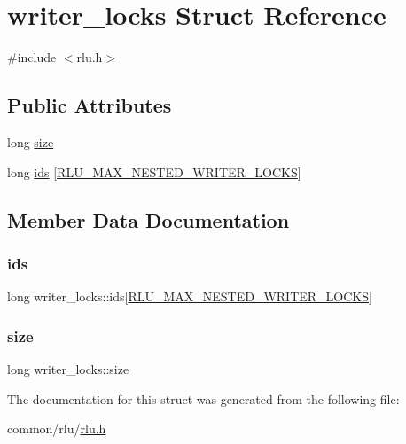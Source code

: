 \hypertarget{structwriter__locks}{}\section{writer\+\_\+locks Struct Reference}
\label{structwriter__locks}


{\ttfamily \#include $<$rlu.\+h$>$}

\subsection*{Public Attributes}
\begin{DoxyCompactItemize}
\item 
long \hyperlink{structwriter__locks_a37620c55c0a1ddde88fd3f857ce7b503}{size}
\item 
long \hyperlink{structwriter__locks_abb68939c5b96b283870aecf6a9a2ec50}{ids} \mbox{[}\hyperlink{rlu_8h_a2dff72d8940c42485455fe15f42735de}{R\+L\+U\+\_\+\+M\+A\+X\+\_\+\+N\+E\+S\+T\+E\+D\+\_\+\+W\+R\+I\+T\+E\+R\+\_\+\+L\+O\+C\+KS}\mbox{]}
\end{DoxyCompactItemize}


\subsection{Member Data Documentation}
\mbox{\label{structwriter__locks_abb68939c5b96b283870aecf6a9a2ec50}} 
\subsubsection{\texorpdfstring{ids}{ids}}
{\footnotesize\ttfamily long writer\+\_\+locks\+::ids\mbox{[}\hyperlink{rlu_8h_a2dff72d8940c42485455fe15f42735de}{R\+L\+U\+\_\+\+M\+A\+X\+\_\+\+N\+E\+S\+T\+E\+D\+\_\+\+W\+R\+I\+T\+E\+R\+\_\+\+L\+O\+C\+KS}\mbox{]}}

\mbox{\label{structwriter__locks_a37620c55c0a1ddde88fd3f857ce7b503}} 
\subsubsection{\texorpdfstring{size}{size}}
{\footnotesize\ttfamily long writer\+\_\+locks\+::size}



The documentation for this struct was generated from the following file\+:\begin{DoxyCompactItemize}
\item 
common/rlu/\hyperlink{rlu_8h}{rlu.\+h}\end{DoxyCompactItemize}
